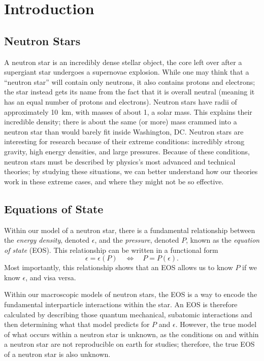 \chapter{Introduction}

% 

\section{Neutron Stars}

A neutron star is an incredibly dense stellar object, the core left over after a supergiant star undergoes a supernovae explosion. While one may think that a ``neutron star'' will contain only neutrons, it also contains protons and electrons; the star instead gets its name from the fact that it is overall neutral (meaning it has an equal number of protons and electrons). Neutron stars have radii of approximately \SI{10}{km}, with masses of about \SI{1}{\odot}, a solar mass. This explains their incredible density; there is about the same (or more) mass crammed into a neutron star than would barely fit inside Washington, DC. Neutron stars are interesting for research because of their extreme conditions: incredibly strong gravity, high energy densities, and large pressures. Because of these conditions, neutron stars must be described by physics's most advanced and technical theories; by studying these situations, we can better understand how our theories work in these extreme cases, and where they might not be so effective.

\section{Equations of State}

Within our model of a neutron star, there is a fundamental relationship between the \textit{energy density}, denoted $\epsilon$, and the \textit{pressure}, denoted $P$, known as the \textit{equation of state} (EOS). This relationship can be written in a functional form
\[\epsilon = \epsilon(P) \quad\Longleftrightarrow\quad P = P(\epsilon). \]
Most importantly, this relationship shows that an EOS allows us to know $P$ if we know $\epsilon$, and visa versa. 

Within our macroscopic models of neutron stars, the EOS is a way to encode the fundamental interparticle interactions within the star. An EOS is therefore calculated by describing those quantum mechanical, subatomic interactions and then determining what that model predicts for $P$ and $\epsilon$. However, the true model of what occurs within a neutron star is unknown, as the conditions on and within a neutron star are not reproducible on earth for studies; therefore, the true EOS of a neutron star is also unknown.

